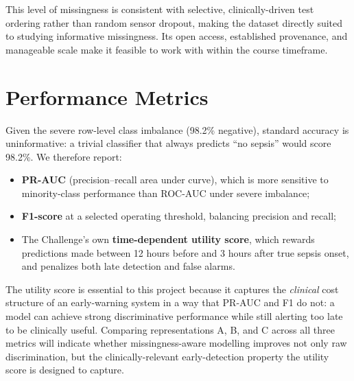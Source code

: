 \documentclass[11pt,a4paper]{article}
\begin{document}
This level of missingness is consistent with selective, clinically-driven
test ordering rather than random sensor dropout, making the dataset directly
suited to studying informative missingness. Its open access, established
provenance, and manageable scale make it feasible to work with within the
course timeframe.

\section{Performance Metrics}

Given the severe row-level class imbalance (98.2\% negative), standard
accuracy is uninformative: a trivial classifier that always predicts
``no sepsis'' would score 98.2\%. We therefore report:

\begin{itemize}[itemsep=2pt]
    \item \textbf{PR-AUC} (precision--recall area under curve), which is more
    sensitive to minority-class performance than ROC-AUC under severe
    imbalance;
    \item \textbf{F1-score} at a selected operating threshold, balancing
    precision and recall;
    \item The Challenge's own \textbf{time-dependent utility score}, which
    rewards predictions made between 12 hours before and 3 hours after true
    sepsis onset, and penalizes both late detection and false alarms.
\end{itemize}

The utility score is essential to this project because it captures the
\emph{clinical} cost structure of an early-warning system in a way that
PR-AUC and F1 do not: a model can achieve strong discriminative performance
while still alerting too late to be clinically useful. Comparing
representations A, B, and C across all three metrics will indicate whether
missingness-aware modelling improves not only raw discrimination, but the
clinically-relevant early-detection property the utility score is designed to
capture.
\end{document}
